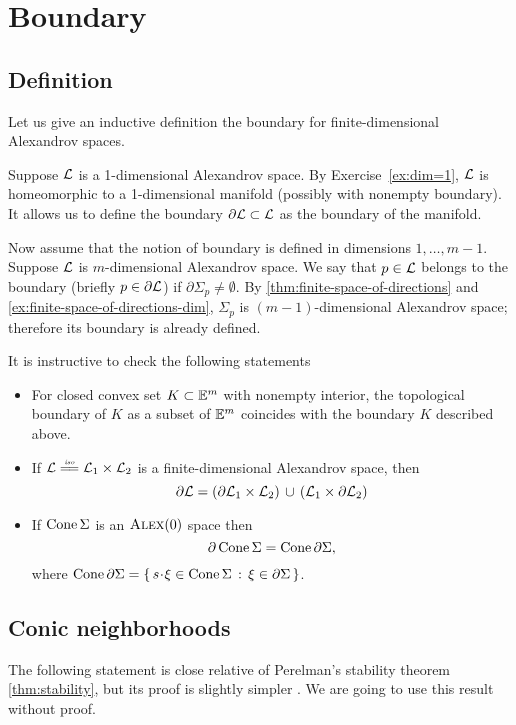 \chapter{Boundary}\label{chap:bry}

\section{Definition}

Let us give an inductive definition the boundary for finite-dimensional Alexandrov spaces.

Suppose $\mathcal{L}$ is a 1-dimensional Alexandrov space.
By Exercise~\ref{ex:dim=1},
$\mathcal{L}$ is homeomorphic to a 1-dimensional manifold (possibly with nonempty boundary).
It allows us to define the boundary $\partial\mathcal{L}\subset \mathcal{L}$ as the boundary of the manifold.

Now assume that the notion of boundary is defined in dimensions $1,\dots,m-1$.
Suppose  $\mathcal{L}$ is $m$-dimensional Alexandrov space.
We say that $p\in \mathcal{L}$ belongs to the boundary (briefly $p\in \partial \mathcal{L}$) if 
$\partial\Sigma_p\ne\emptyset$.
By \ref{thm:finite-space-of-directions} and \ref{ex:finite-space-of-directions-dim}, $\Sigma_p$ is $(m-1)$-dimensional Alexandrov space;
therefore its boundary is already defined.

It is instructive to check the following statements
\begin{itemize}
\item For closed convex set $K\subset \mathbb{E}^m$ with nonempty interior, the topological boundary of $K$ as a subset of $\mathbb{E}^m$ coincides with the boundary $K$ described above.
\item If $\spc{L}\iso\spc{L}_1\times\spc{L}_2$ is a finite-dimensional Alexandrov space,
then
\[\partial \mathcal{L}=(\partial\mathcal{L}_1\times\mathcal{L}_2)\,\cup\,(\mathcal{L}_1\times\partial\mathcal{L}_2)\]
\item If $\mathop{\rm Cone}\nolimits\Sigma$ is an $\textsc{Alex}(0)$ space then
\[\partial \mathop{\rm Cone}\nolimits\Sigma=\mathop{\rm Cone}\nolimits\partial\Sigma,\]
where $\Cone\partial\Sigma=\set{s\cdot \xi\in\Cone\Sigma }{\xi\in \partial\Sigma}$.
\end{itemize}


\section{Conic neighborhoods}

The following statement is close relative of Perelman's stability theorem \ref{thm:stability}, but its proof is slightly simpler \cite{perelman:morse}.
We are going to use this result without proof.

